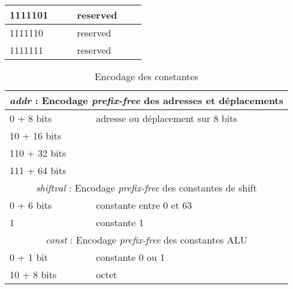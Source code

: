 \documentclass[architecture]{compas2018}
\begin{document}
\begin{table}[!h]
\begin{center}
\begin{tabular}{|l|l|l|l|l|c|}
    \hline
    1111101 & \texttt{}       &                               & reserved                                             &      &             \\
    \hline
    1111110 & \texttt{}       &                               & reserved                                             &      &             \\
    \hline
    1111111 & \texttt{}       &                               & reserved                                             &      &             \\
    \hline
  \end{tabular}
\end{center}
\end{table}


\begin{table}
  \label{tab:constantes}
  \centering
  \caption{Encodage des constantes}
  \begin{tabular}{|l|l|}
    \hline
    \multicolumn{2}{|c|}{\textit{addr} : Encodage \emph{prefix-free} des adresses et déplacements} \\
    \hline
    0 + 8 bits    & adresse ou déplacement sur 8 bits                                              \\
    \hline
    10 + 16 bits  &                                                                                \\
    \hline
    110 + 32 bits &                                                                                \\
    \hline
    111 + 64 bits &                                                                                \\
    \hline
    \hline
    \multicolumn{2}{|c|}{\textit{shiftval} : Encodage \emph{prefix-free} des constantes de shift}  \\
    \hline
    0 + 6 bits    & constante entre 0 et 63                                                        \\
    \hline
    1             & constante 1                                                                    \\
    \hline
    \hline
    \multicolumn{2}{|c|}{\textit{const} : Encodage \emph{prefix-free} des constantes ALU}          \\
    \hline
    0 + 1 bit     & constante 0 ou 1                                                               \\
    \hline
    10 + 8 bits   & octet                                                                          \\

\end{tabular}
\end{table}
\end{document}
